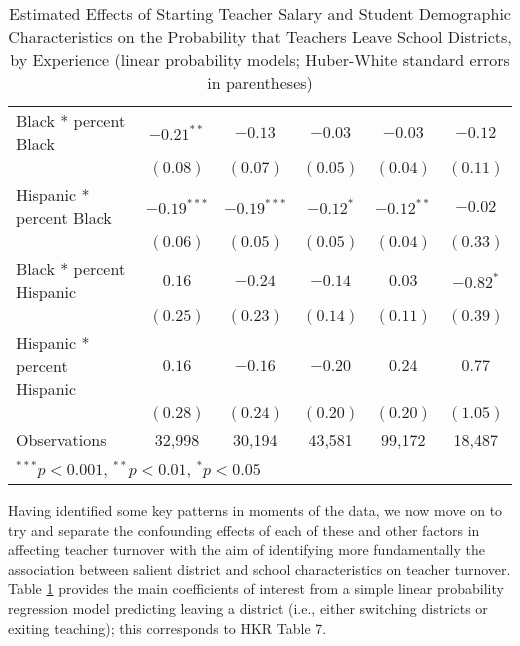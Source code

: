 \documentclass[12pt,]{article}
\begin{document}
\begin{table}
\begin{center}
\begin{tabular}{l c c c c c }
\quad Black * percent Black                 & $-0.21^{**}$  & $-0.13$       & $-0.03$       & $-0.03$      & $-0.12$      \\
                                            & $(0.08)$      & $(0.07)$      & $(0.05)$      & $(0.04)$     & $(0.11)$     \\
\quad Hispanic * percent Black              & $-0.19^{***}$ & $-0.19^{***}$ & $-0.12^{*}$   & $-0.12^{**}$ & $-0.02$      \\
                                            & $(0.06)$      & $(0.05)$      & $(0.05)$      & $(0.04)$     & $(0.33)$     \\
\quad Black * percent Hispanic              & $0.16$        & $-0.24$       & $-0.14$       & $0.03$       & $-0.82^{*}$  \\
                                            & $(0.25)$      & $(0.23)$      & $(0.14)$      & $(0.11)$     & $(0.39)$     \\
\quad Hispanic * percent Hispanic           & $0.16$        & $-0.16$       & $-0.20$       & $0.24$       & $0.77$       \\
                                            & $(0.28)$      & $(0.24)$      & $(0.20)$      & $(0.20)$     & $(1.05)$     \\
\hline
Observations                                & 32,998         & 30,194         & 43,581         & 99,172        & 18,487        \\
\hline
\multicolumn{6}{l}{\scriptsize{$^{***}p<0.001$, $^{**}p<0.01$, $^*p<0.05$}}
\end{tabular}
\caption{Estimated Effects of Starting Teacher Salary and Student Demographic Characteristics on the Probability that Teachers Leave School Districts, by Experience (linear probability models; Huber-White standard  errors in parentheses)}
\label{tbl:reg_lpm}
\end{center}
\end{table}

Having identified some key patterns in moments of the data, we now move
on to try and separate the confounding effects of each of these and
other factors in affecting teacher turnover with the aim of identifying
more fundamentally the association between salient district and school
characteristics on teacher turnover. Table \ref{tbl:reg_lpm} provides
the main coefficients of interest from a simple linear probability
regression model predicting leaving a district (i.e., either switching
districts or exiting teaching); this corresponds to HKR Table 7.
\end{document}
